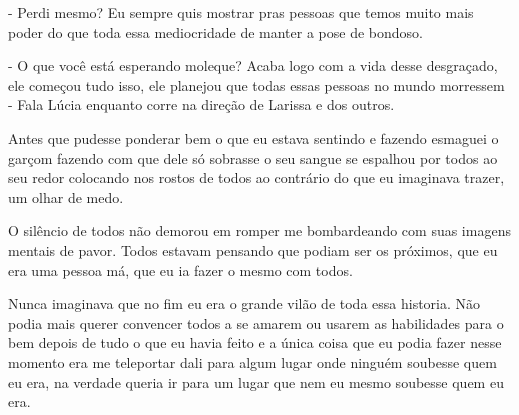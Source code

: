- Perdi mesmo? Eu sempre quis mostrar pras pessoas que temos muito mais poder do que toda essa mediocridade de manter a pose de bondoso.

- O que você está esperando moleque? Acaba logo com a vida desse desgraçado, ele começou tudo isso, ele planejou que todas essas pessoas no mundo morressem - Fala Lúcia enquanto corre na direção de Larissa e dos outros.

Antes que pudesse ponderar bem o que eu estava sentindo e fazendo esmaguei o garçom fazendo com que dele só sobrasse o seu sangue se espalhou por todos ao seu redor colocando nos rostos de todos ao contrário do que eu imaginava trazer, um olhar de medo.

O silêncio de todos não demorou em romper me bombardeando com suas imagens mentais de pavor. Todos estavam pensando que podiam ser os próximos, que eu era uma pessoa má, que eu ia fazer o mesmo com todos.

Nunca imaginava que no fim eu era o grande vilão de toda essa historia. Não podia mais querer convencer todos a se amarem ou usarem as habilidades para o bem depois de tudo o que eu havia feito e a única coisa que eu podia fazer nesse momento era me teleportar dali para algum lugar onde ninguém soubesse quem eu era, na verdade queria ir para um lugar que nem eu mesmo soubesse quem eu era.